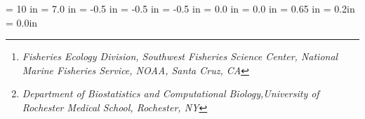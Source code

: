 \textwidth = 10 in
\textheight = 7.0 in
\oddsidemargin = -0.5 in
\evensidemargin = -0.5 in
\topmargin = -0.5 in
\headheight = 0.0 in
\headsep = 0.0 in
\footskip = 0.65 in
\parskip = 0.2in
\parindent = 0.0in


\makeatletter
\renewcommand{\thefigure}{\ifnum \c@chapter>\z@ \thechapter.\fi S\SupNum{}--\@arabic\c@figure}
\renewcommand*\l@figure{\@dottedtocline{1}{1.5em}{3.3em}}
\renewcommand{\thesection}{}
\renewcommand\section{\@startsection {section}{1}{-5.6mm}%
                                   {-3.5ex \@plus -1ex \@minus -.2ex}%
                                   {2.3ex \@plus.2ex}%
                                   {\normalfont\Large\bfseries}}

\makeatother


\newcommand{\ArticleName}{``An Assessment of Sibship Reconstruction \\
Programs with Simulated Data''}

\author{Eric C. Anderson\thanks{\em Fisheries Ecology Division, Southwest Fisheries Science Center, National Marine Fisheries Service, NOAA, Santa Cruz, CA} \and 
Anthony Almudevar\thanks{{\em Department of Biostatistics and Computational Biology,University of Rochester Medical School, Rochester, NY}}
}


